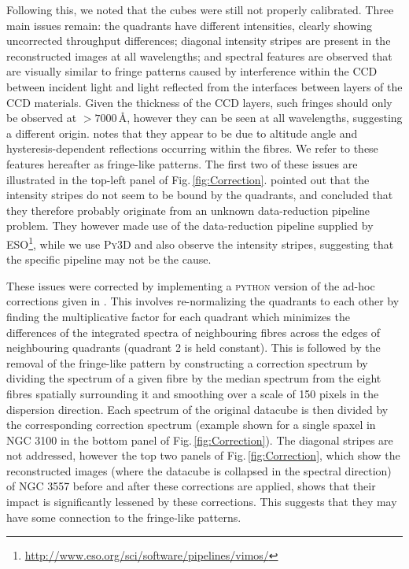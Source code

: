 		Following this, we noted that the cubes were still not properly calibrated. Three main issues remain: the quadrants have different intensities, clearly showing uncorrected throughput differences; diagonal intensity stripes are present in the reconstructed images at all wavelengths; and spectral features are observed \citep{Jullo2008} that are visually similar to fringe patterns caused by interference within the CCD between incident light and light reflected from the interfaces between layers of the CCD materials. Given the thickness of the CCD layers, such fringes should only be observed at $>7000$\,\AA, however they can be seen at all wavelengths, suggesting a different origin. \citet{Lagerholm2012} notes that they appear to be due to altitude angle and hysteresis-dependent reflections occurring within the fibres. We refer to these features hereafter as fringe-like patterns. The first two of these issues are illustrated in the top-left panel of Fig.\,\ref{fig:Correction}. \citet{Lagerholm2012} pointed out that the intensity stripes do not seem to be bound by the quadrants, and concluded that they therefore probably originate from an unknown data-reduction pipeline problem. They however made use of the data-reduction pipeline supplied by ESO\footnote{\url{http://www.eso.org/sci/software/pipelines/vimos/}}, while we use \textsc{Py3D} and also observe the intensity stripes, suggesting that the specific pipeline may not be the cause. 

		These issues were corrected by implementing a \textsc{python} version of the ad-hoc corrections given in \citet{Lagerholm2012}. This involves re-normalizing the quadrants to each other by finding the multiplicative factor for each quadrant which minimizes the differences of the integrated spectra of neighbouring fibres across the edges of neighbouring quadrants (quadrant 2 is held constant). This is followed by the removal of the fringe-like pattern by constructing a correction spectrum by dividing the spectrum of a given fibre by the median spectrum from the eight fibres spatially surrounding it and smoothing over a scale of 150 pixels in the dispersion direction. Each spectrum of the original datacube is then divided by the corresponding correction spectrum (example shown for a single spaxel in NGC 3100 in the bottom panel of Fig.\,\ref{fig:Correction}). The diagonal stripes are not addressed, however the top two panels of Fig.\,\ref{fig:Correction}, which show the reconstructed images (where the datacube is collapsed in the spectral direction) of NGC 3557 before and after these corrections are applied, shows that their impact is significantly lessened by these corrections. This suggests that they may have some connection to the fringe-like patterns. 

